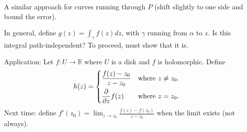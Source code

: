 \documentclass{artikel3}
\newcommand{\complex}{\mathbb{R}}
\newcommand{\del}{\partial}
\begin{document}
A similar approach for curves running through $P$ (shift slightly to one side and bound the error).

In general, define $g(z)=\int_\gamma f(z)dz$, with $\gamma$ running from $\alpha$ to $z$.
Is this integral path-independent?  To proceed, must show that it is.

Application: Let $f:U\to\complex$ where $U$ is a disk and $f$ is holomorphic.
Define \[
	h(z)=\begin{dcases*}
		\frac{f(z)-z_0}{z-z_0}&where $z\neq z_0$.\\
		\frac{\del}{\del z}f(z)&where $z=z_0$.
	\end{dcases*}
\] Next time: define $f'(z_0)=\lim_{z\to z_0}\frac{f(z)-f(z_0)}{z-z_0}$ when the
limit exists (not always).

\label{lastpage}
\end{document}
